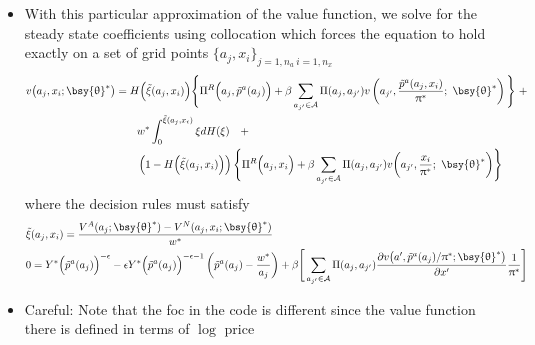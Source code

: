 \documentclass[a4paper,10pt]{article}  %
\begin{document}
\begin{itemize}[label=\raisebox{0.50ex}{\tiny$\bullet$}]
   \item With this particular approximation of the value function, we solve for the steady state coefficients 
   using collocation which forces the equation to hold exactly on a set of grid points $ \big\{a_j, x_i \big\}_{j=1,n_a \ i =1,n_x} $
   \begin{align*}
      v \big( a_j, x_i; \bsy{\uptheta}^* \big) & = 
      H \Big( \tilde{\xi}(a_j,x_i) \Big) 
         \Bigg\{ 
               \Pi^R\Big( a_j, \tilde{p}^a (a_j) \Big) + \beta\sum_{a_{j'}\in \mathcal{A} } \Pi(a_j,a_{j'})
               v \left( a_{j'},\frac{\tilde{p}^a (a_j, x_i)}{\uppi^*} ; \ \bsy{\uptheta}^* \right) 
         \Bigg\} \  + \\
      & \qquad w^* \int_0^{ \tilde{\xi}(a_j,x_i) } \xi dH(\xi) \quad + \\
      & \qquad \left( 1- H\Big( \tilde{\xi}(a_j,x_i) \Big) \right) 
         \Bigg\{
               \Pi^R\Big( a_j, x_i \Big) + \beta\sum_{a_{j'}\in \mathcal{A} } \Pi(a_j,a_{j'})
               v \bigg( a_{j'},\frac{x_i}{\uppi^*} ; \ \bsy{\uptheta}^* \bigg) 
         \Bigg\}
   \end{align*}
   where the decision rules must satisfy
   \small \begin{align}
      \label{eq:policies_eq1}
      & \tilde{\xi}(a_j, x_i) = \frac{ V^A(a_j; \bsy{\uptheta}^*) - V^N(a_j, x_i ; \bsy{\uptheta}^*) }{ w^* } \\
      \label{eq:policies_eq2} 
      & 0 = Y^* \Big( \tilde{p}^a( a_j ) \Big)^{-\epsilon}   - 
         \epsilon Y^* \Big( \tilde{p}^a( a_j ) \Big)^{-\epsilon-1} \left( \tilde{p}^a( a_j ) - \frac{ w^* }{a_j} \right) +
         \beta 
         \Bigg[ 
               \sum_{a_{j'}\in \mathcal{A} } \Pi(a_j,a_{j'}) 
               \frac{ \partial v \big( a', \tilde{p}^a( a_j )/\uppi^* ; \bsy{\uptheta}^*\big) }{ \partial x' } \frac{1}{\uppi^*}
         \Bigg]
   \end{align} \normalsize

   \item {\sc \color{RubineRed} Careful:} Note that the foc in the code is different since the value function there is defined in terms
   of $ \log $ price
\end{itemize}
\end{document}
